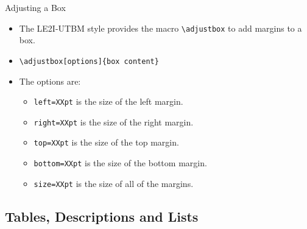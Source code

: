 \documentclass[english,sectioncirclenumberstyle]{le2iutbmbeamer}
\begin{document}
\begin{frame}{Adjusting a Box}
	\begin{itemize}
	\item The LE2I-UTBM style provides the macro \texttt{{\textbackslash}adjustbox} to add margins to a box.
	\vspace{1em}
	\item \texttt{{\textbackslash}adjustbox[options]\{box content\}}
	\vspace{1em}
	\item The options are:
		\begin{itemize}
		\item \texttt{left=XXpt} is the size of the left margin.
		\item \texttt{right=XXpt} is the size of the right margin.
		\item \texttt{top=XXpt} is the size of the top margin.
		\item \texttt{bottom=XXpt} is the size of the bottom margin.
		\item \texttt{size=XXpt} is the size of all of the margins.
		\end{itemize}
	\end{itemize}
\end{frame}

\subsection{Tables, Descriptions and Lists}
\tableofcontentslide[sectionstyle={show/shaded},subsectionstyle={show/shaded/hide},subsubsectionstyle={hide/hide/hide/hide},sections={3-}]
\end{document}
